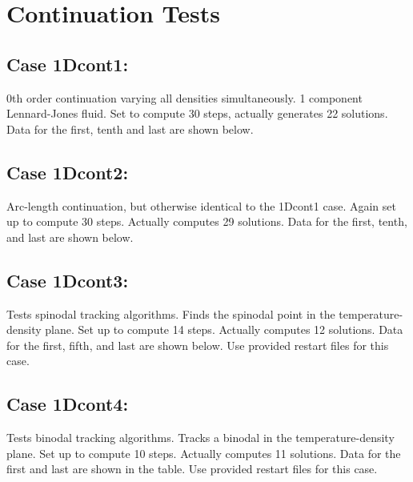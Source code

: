 \documentclass[10pt,onecolumn]{article}
\begin{document}
\section{Continuation Tests}
\subsection{Case 1Dcont1:} 0th order continuation varying all densities simultaneously.
1 component Lennard-Jones fluid.  Set to compute 30 steps, actually 
generates 22 solutions.  Data for the first, tenth and last are shown below.

\subsection{Case 1Dcont2:} Arc-length continuation, but otherwise identical to 
the 1Dcont1 case.  Again set up to compute 30 steps.  Actually computes 29 
solutions.  Data for the first, tenth, and last are shown below.

\subsection{Case 1Dcont3:} Tests spinodal tracking algorithms.  Finds the spinodal point in the temperature-density plane.  Set up to compute 14 steps.
Actually computes 12 solutions.  Data for the first, fifth, and last are shown below.  Use provided restart files for this case.

\subsection{Case 1Dcont4:} Tests binodal tracking algorithms.  Tracks a binodal in the
temperature-density plane.  Set up to compute 10 steps.  Actually computes
11 solutions.  Data for the first and last are shown in the table.  Use provided restart files for this case.
\end{document}
